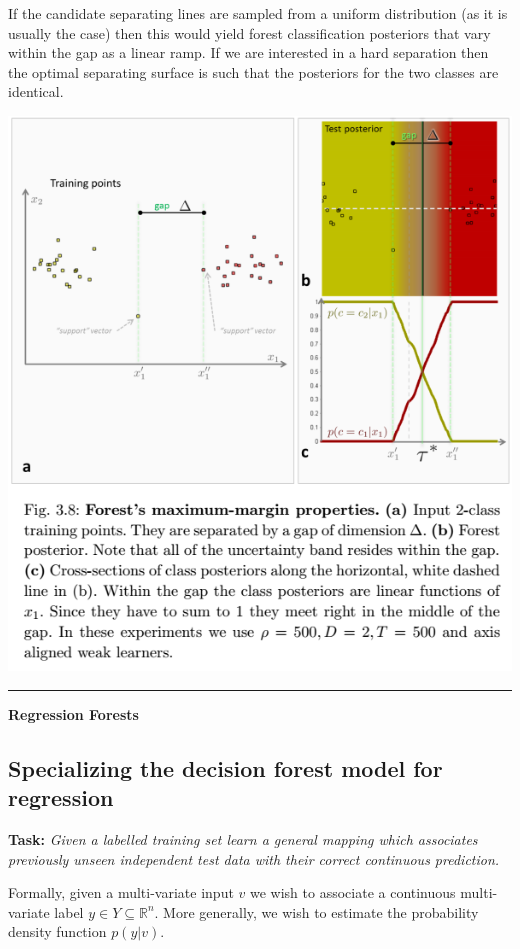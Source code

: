 \documentclass{scrartcl}
\begin{document}
\begin{appendices}
If the candidate separating lines are sampled from a uniform distribution (as it is usually the case) then this would yield forest classification posteriors that vary within the gap as a linear ramp. If we are interested in a hard separation then the optimal separating surface is such that the posteriors for the two classes are identical.

\begin{center}
    \includegraphics[scale=0.7]{img/forestmaxmargin}
\end{center}

\rule{\textwidth}{1pt}
\textbf{Regression Forests}

\subsection{Specializing the decision forest model for regression}
\textbf{Task:}
\textit{Given a labelled training set learn a general mapping which associates previously unseen independent test data with their correct continuous prediction.}

Formally, given a multi-variate input \(v\) we wish to associate a continuous multi-variate label \(y \in Y \subseteq \mathbb{R}^n\). More generally, we wish to estimate the probability density function \(p(y|v)\).


\end{appendices}
\end{document}
